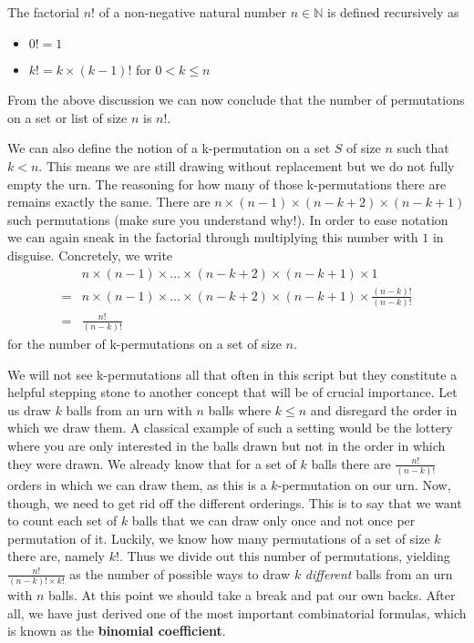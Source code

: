 \begin{Definition}[Factorial]
The factorial $ n! $ of a non-negative natural number $ n \in \mathbb{N} $ is defined recursively as 
\begin{itemize}
\item $ 0! = 1 $
\item $ k! = k\times (k-1)! $ for $ 0 < k \leq n $
\end{itemize}
\end{Definition}

From the above discussion we can now conclude that the number of permutations on a set or list of size $ n $
is $ n! $. 

We can also define the notion of a k-permutation on a set $ S $ of size $ n $ such that $ k < n $.
This means we are still drawing without replacement but we do not fully empty the urn. The reasoning for how
many of those k-permutations there are remains exactly the same. There are $ n \times (n-1) \times (n-k+2) 
\times (n-k+1) $ such permutations (make sure you understand why!). In order to ease notation we can again
sneak in the factorial through multiplying this number with $ 1 $ in disguise. Concretely, we write
\begin{align*}
&n \times (n-1) \times \ldots \times (n-k+2) \times (n-k+1) \times 1 \\
=& n \times (n-1) \times \ldots \times (n-k+2) \times (n-k+1) \times \frac{(n-k)!}{(n-k)!} \\
=& \frac{n!}{(n-k)!}
\end{align*}
for the number of k-permutations on a set of size $ n $.

We will not see k-permutations all that often in this script but they constitute a helpful stepping stone to another
concept that will be of crucial importance. Let us draw $ k $ balls from an urn with $ n $ balls where $ k \leq n $ and disregard
the order in which we draw them. A classical example of such a setting would be the lottery where you are only interested in the
balls drawn but not in the order in which they were drawn. We already know that for a set of $ k $ balls there are $ \frac{n!}{(n-k)!} $ 
orders in which we can draw them, as this is a $ k $-permutation on our urn. Now, though, we need to get rid off the different 
orderings. This is to say that we want to count each set of $ k $ balls that we can draw only once and not once per permutation of it.
Luckily, we know how many permutations of a set of size $ k $ there are, namely $ k! $. Thus we divide out this number of permutations,
yielding $ \frac{n!}{(n-k)!\times k!} $ as the number of possible ways to draw $ k $ \textit{different} balls from an urn with $ n $
balls.
At this point we should take a break and pat our own backs. After all, we have just derived one of the most important combinatorial 
formulas, which is known as the \textbf{binomial coefficient}.

